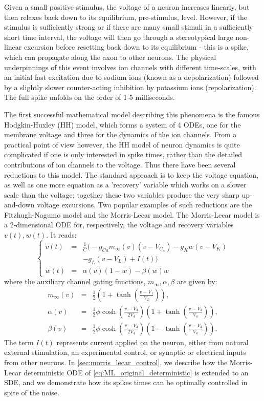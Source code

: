 Given a small positive stimulus, the voltage of a neuron increases linearly, but
then relaxes back down to its equilibrium, pre-stimulus, level. However, if the
stimulus is sufficiently strong or if there are many small stimuli in a
sufficiently short time interval, the voltage will then go through a stereotypical large
 non-linear excursion before resetting back down to its equilibrium
 - this is a spike, which can propagate along the axon to other neurons. 
 The physical underpinnings of this event involves ion
 channels with different time-scales, with an initial fast excitation due to sodium ions (known as a depolarization) 
 followed by a slightly slower counter-acting inhibition by potassium ions (repolarization). 
 The full spike unfolds on the order of 1-5 milliseconds. 
 
 The first successful mathematical model describing this
 phenomena is the famous Hodgkin-Huxley (HH) model, which forms a system of 4
 ODEs, one for the membrane voltage and three for the dynamics of the ion
 channels. From a practical point of view however, the HH model of
neuron dynamics is quite complicated if one is only interested in spike times,
 rather than the detailed contributions of ion channels to the voltage. Thus there have been several
 reductions to this model. The standard approach is to keep the voltage equation, 
 as well as one more equation as a 'recovery' variable which works on a slower
 scale than the voltage; together these two variables produce the very sharp up-and-down voltage
 excursions. Two popular examples of such reductions are the Fitzhugh-Nagumo
 model and the Morris-Lecar model. The Morris-Lecar model
 is a 2-dimensional ODE for, respectively, the voltage and recovery variables $v(t), w(t)$. It reads:
\begin{equation}
\left\{
\begin{array}{ccl}
\dot{v}(t)  &=& \frac{1}{C}\Big(-g_{Ca}m_\infty(v) (v-V_{C_a}) -
g_K w (v-V_K) \\ && 
-g_L(v-V_L)+I(t)  \Big) \\
\dot{w}(t)&=& \alpha(v)(1-w) - \beta(w)w
\end{array}
\right.
\label{eq:ML_original_deterministic}
\end{equation}
where the auxiliary channel gating functions, $m_\infty, \alpha, \beta$ are given by:
\begin{eqnarray*}
m_\infty(v)&=&\frac{1}{2}\left(1+\tanh\left(\frac{v-V_1}{V_2}\right)\right),\\
\alpha(v) &=& \frac{1}{2}\phi \cosh\left(\frac{v-V_3}{2V_4}\right)\left(1+\tanh\left(\frac{v-V_3}{V_4}\right)\right),\\
\beta(v) &=& \frac{1}{2}\phi \cosh\left(\frac{v-V_3}{2V_4}\right)\left(1-\tanh\left(\frac{v-V_3}{V_4}\right)\right).
\end{eqnarray*} 
The term $I(t)$ represents current applied on the neuron, either from natural
external stimulation, an experimental control, or synaptic or electrical inputs from other neurons. 
In \cref{sec:morris_lecar_control}, we describe how the Morris-Lecar
deterministic ODE of \cref{eq:ML_original_deterministic} is extended to an SDE, and we demonstrate how its spikes times can be optimally controlled in spite of the noise.
 
